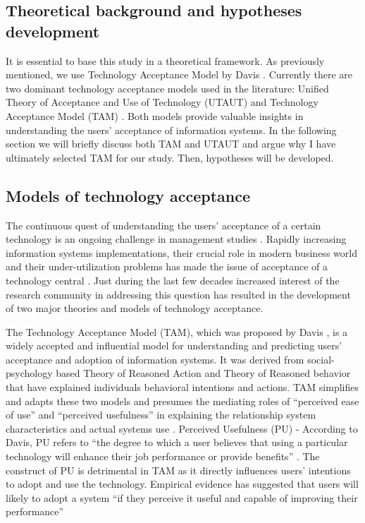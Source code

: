 \documentclass[a4paper,12pt]{article}
\newcommand{\citeyearonly}[1]{\citeyearpar{#1}}
\begin{document}
\subsection{Theoretical background and hypotheses development}

It is essential to base this study in a theoretical framework. As previously mentioned, we use Technology Acceptance Model by Davis \citeyearonly{davis1985technology}. Currently there are two dominant technology acceptance models used in the literature: Unified Theory of Acceptance and Use of Technology (UTAUT) and Technology Acceptance Model (TAM) \citep{davis1985technology, venkatesh2003utaut}. Both models provide valuable insights in understanding the users' acceptance of information systems. In the following section we will briefly discuss both TAM and UTAUT and argue why I have ultimately selected TAM for our study. Then, hypotheses will be developed.

\subsection{Models of technology acceptance}

The continuous quest of understanding the users' acceptance of a certain technology is an ongoing challenge in management studies \citep{schwarz2007looking, williams2009contemporary}.  Rapidly increasing information systems implementations, their crucial role in modern business world and their under-utilization problems has made the issue of acceptance of a technology central \citep{lancelotmiltgenDeterminantsEnduserAcceptance2013}. Just during the last few decades increased interest of the research community in addressing this question has resulted in the development of two major theories and models of technology acceptance. 

The Technology Acceptance Model (TAM), which was proposed by Davis \citeyearonly{davis1985technology}, is a widely accepted and influential model for understanding and predicting users' acceptance and adoption of information systems. It was derived from social-psychology based Theory of Reasoned Action and Theory of Reasoned behavior that have explained individuals behavioral intentions and actions. TAM simplifies and adapts these two models and presumes the mediating roles of ``perceived ease of use'' and ``perceived usefulness'' in explaining the relationship system characteristics and actual systems use \citep{marangunic2015technology}. 
Perceived Usefulness (PU) - According to Davis, PU refers to ``the degree to which a user believes that using a particular technology will enhance their job performance or provide benefits'' \citep{davis1985technology}. The construct of PU is detrimental in TAM as it directly influences users' intentions to adopt and use the technology. Empirical evidence has suggested that users will likely to adopt a system ``if they perceive it useful and capable of improving their performance'' \citep{davis1985technology}
\end{document}
